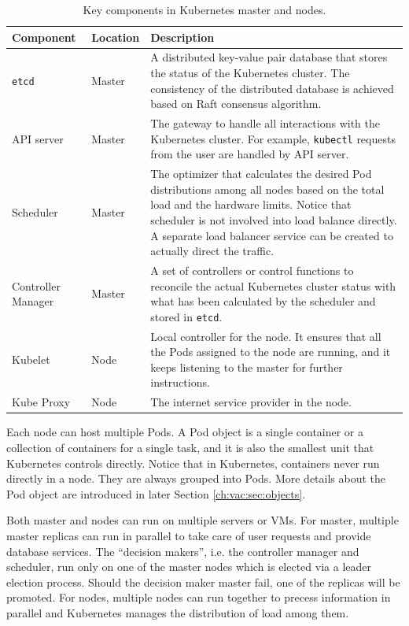 \begin{table}[!htb]
	\centering
	\caption{Key components in Kubernetes master and nodes.} \label{ch:vac:tab:keycomponents}
	\begin{tabularx}{\textwidth}{llX}
		\hline
		Component & Location & Description \\
		\hline
		\verb|etcd| & Master & A distributed key-value pair database that stores the status of the Kubernetes cluster. The consistency of the distributed database is achieved based on Raft consensus algorithm. \\ \hline
		API server & Master & The gateway to handle all interactions with the Kubernetes cluster. For example, \verb|kubectl| requests from the user are handled by API server. \\ \hline
		Scheduler & Master & The optimizer that calculates the desired Pod distributions among all nodes based on the total load and the hardware limits. Notice that scheduler is not involved into load balance directly. A separate load balancer service can be created to actually direct the traffic. \\ \hline
		Controller Manager & Master & A set of controllers or control functions to reconcile the actual Kubernetes cluster status with what has been calculated by the scheduler and stored in \verb|etcd|. \\ \hline
		Kubelet & Node & Local controller for the node. It ensures that all the Pods assigned to the node are running, and it keeps listening to the master for further instructions. \\ \hline
		Kube Proxy & Node & The internet service provider in the node. \\
		\hline
	\end{tabularx}
\end{table}

Each node can host multiple Pods. A Pod object is a single container or a collection of containers for a single task, and it is also the smallest unit that Kubernetes controls directly. Notice that in Kubernetes, containers never run directly in a node. They are always grouped into Pods. More details about the Pod object are introduced in later Section \ref{ch:vac:sec:objects}.

Both master and nodes can run on multiple servers or VMs. For master, multiple master replicas can run in parallel to take care of user requests and provide database services. The ``decision makers'', i.e. the controller manager and scheduler, run only on one of the master nodes which is elected via a leader election process. Should the decision maker master fail, one of the replicas will be promoted. For nodes, multiple nodes can run together to precess information in parallel and Kubernetes manages the distribution of load among them.

